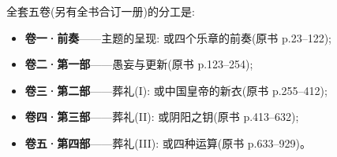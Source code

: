 {全套五卷(另有全书合订一册)的分工是:

\begin{itemize}
  \item \textbf{卷一·前奏}——主题的呈现: 或四个乐章的前奏(原书 p.23--122);
  \item \textbf{卷二·第一部}——愚妄与更新(原书 p.123--254);
  \item \textbf{卷三·第二部}——葬礼(I): 或中国皇帝的新衣(原书 p.255--412);
  \item \textbf{卷四·第三部}——葬礼(II): 或阴阳之钥(原书 p.413--632);
  \item \textbf{卷五·第四部}——葬礼(III): 或四种运算(原书 p.633--929)。
\end{itemize}
}
